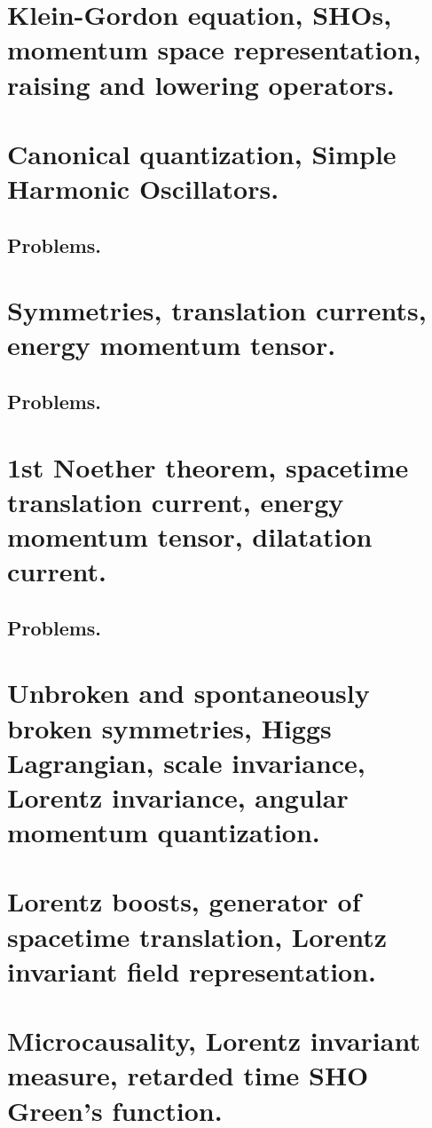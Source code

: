   \chapter{Klein-Gordon equation, SHOs, momentum space representation, raising and lowering operators.}
      
   \chapter{Canonical quantization, Simple Harmonic Oscillators.}
      
      \section{Problems.}
         
         
   \chapter{Symmetries, translation currents, energy momentum tensor.}
      
      
      \section{Problems.}
         
   \chapter{1st Noether theorem, spacetime translation current, energy momentum tensor, dilatation current.}
      
      \section{Problems.}
         
   \chapter{Unbroken and spontaneously broken symmetries, Higgs Lagrangian, scale invariance, Lorentz invariance, angular momentum quantization.}
      
   \chapter{Lorentz boosts, generator of spacetime translation, Lorentz invariant field representation.}
      
   \chapter{Microcausality, Lorentz invariant measure, retarded time SHO Green's function.}
      
